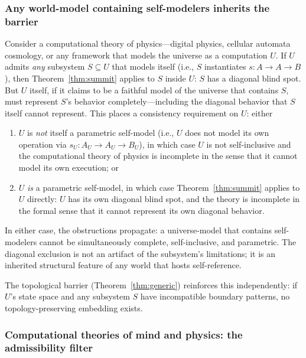 \documentclass[11pt]{article}
\begin{document}
\subsubsection{Any world-model containing self-modelers inherits the barrier}

Consider a computational theory of physics---digital physics, cellular
automata cosmology, or any framework that models the universe as a
computation $U$.  If $U$ admits \emph{any} subsystem $S \subseteq U$
that models itself (i.e., $S$ instantiates $s : A \to A \to B$),
then Theorem~\ref{thm:summit} applies to $S$ inside $U$: $S$ has a
diagonal blind spot.  But $U$ itself, if it claims to be a faithful
model of the universe that contains $S$, must represent $S$'s behavior
completely---including the diagonal behavior that $S$ itself cannot
represent.  This places a consistency requirement on $U$: either

\begin{enumerate}[label=(\roman*),itemsep=0.2ex]
\item $U$ is \emph{not} itself a parametric self-model (i.e., $U$ does
  not model its own operation via $s_U : A_U \to A_U \to B_U$), in
  which case $U$ is not self-inclusive and the computational theory of
  physics is incomplete in the sense that it cannot model its own
  execution; or
\item $U$ \emph{is} a parametric self-model, in which case
  Theorem~\ref{thm:summit} applies to $U$ directly: $U$ has its own
  diagonal blind spot, and the theory is incomplete in the formal
  sense that it cannot represent its own diagonal behavior.
\end{enumerate}

\noindent
In either case, the obstructions propagate: a universe-model that
contains self-modelers cannot be simultaneously complete, self-inclusive,
and parametric.  The diagonal exclusion is not an artifact of the
subsystem's limitations; it is an inherited structural feature of any
world that hosts self-reference.

The topological barrier (Theorem~\ref{thm:generic}) reinforces this
independently: if $U$'s state space and any subsystem $S$ have
incompatible boundary patterns, no topology-preserving embedding
exists.

\subsubsection{Computational theories of mind and physics: the admissibility filter}
\end{document}
